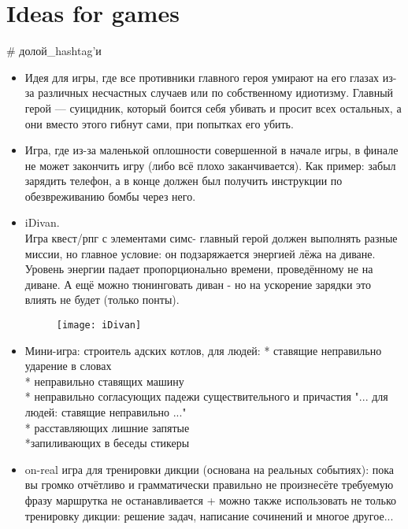 \section{Ideas for games}
\begin{epigraph}
    \# долой_hashtag'и
\end{epigraph}

\begin{itemize}
\item Идея для игры, где все противники главного героя умирают на его глазах из-за различных несчастных случаев или по собственному идиотизму.
Главный герой --- суицидник, который боится себя убивать и просит всех остальных, а они вместо этого гибнут сами, при попытках его убить.
\item Игра, где из-за маленькой оплошности совершенной в начале игры, в финале не может закончить игру (либо всё плохо заканчивается).
Как пример: забыл зарядить телефон, а в конце должен был получить инструкции по обезвреживанию бомбы через него.
\item iDivan.\\
Игра квест/рпг с элементами симс- главный герой должен выполнять разные миссии, но главное условие: он подзаряжается энергией лёжа на диване.
Уровень энергии падает пропорционально времени, проведённому не на диване. А ещё можно тюнинговать диван - но на ускорение зарядки это влиять
не будет (только понты).

\begin{figure}[ht!]
        \centering
        \texttt{[image: iDivan]}
\end{figure}
\item Мини-игра: строитель адских котлов, для людей:
* ставящие неправильно ударение в словах\\
* неправильно ставящих машину\\
* неправильно согласующих падежи существительного и причастия "... для людей: ставящие неправильно ..."\\
* расставляющих лишние запятые\\
*запиливающих в беседы стикеры
\item on-real игра для тренировки дикции (основана на реальных событиях): пока вы громко отчётливо и грамматически правильно не произнесёте 
требуемую фразу маршрутка не останавливается + можно также использовать не только тренировку дикции: решение задач, написание сочинений 
и многое другое...
\end{itemize}
